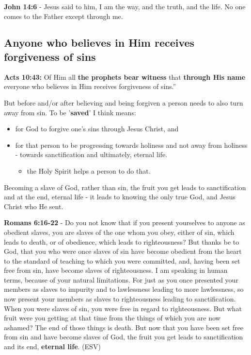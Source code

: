 \documentclass[11pt]{article}
\begin{document}
\textbf{John 14:6} - Jesus said to him, I am the way, and the truth, and the life. No one comes to the Father except through me.

\subsection{Anyone who believes in Him receives forgiveness of sins}
\label{sec:org97dd970}
\textbf{Acts 10:43:} Of Him all \textbf{the prophets bear witness} that \textbf{through His name} everyone who believes in Him receives forgiveness of sins.”

But before and/or after believing and being forgiven a person needs to also turn away from sin.
To be '\textbf{saved}' I think means:
\begin{itemize}
\item for God to forgive one's sins through Jesus Christ, and
\item for that person to be progressing towards holiness and not away from holiness - towards sanctification and ultimately, eternal life.
\begin{itemize}
\item the Holy Spirit helps a person to do that.
\end{itemize}
\end{itemize}

Becoming a slave of God, rather than sin, the fruit you get leads to sanctification and at the end, eternal life - it leads to knowing the only true God, and Jesus Christ who He sent.

\textbf{Romans 6:16-22} - Do you not know that if you present yourselves to anyone as obedient slaves, you are slaves of the one whom you obey, either of sin, which leads to death, or of obedience, which leads to righteousness?  But thanks be to God, that you who were once slaves of sin have become obedient from the heart to the standard of teaching to which you were committed, and, having been set free from sin, have become slaves of righteousness.  I am speaking in human terms, because of your natural limitations.  For just as you once presented your members as slaves to impurity and to lawlessness leading to more lawlessness, so now present your members as slaves to righteousness leading to sanctification.  When you were slaves of sin, you were free in regard to righteousness.  But what fruit were you getting at that time from the things of which you are now ashamed?  The end of those things is death.  But now that you have been set free from sin and have become slaves of God, the fruit you get leads to sanctification and its end, \textbf{eternal life}.  (ESV)
\end{document}
